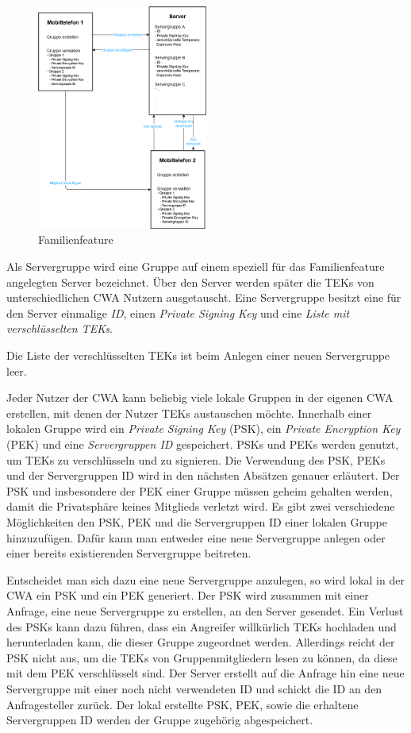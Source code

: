 \documentclass[conference,compsoc]{IEEEtran}
\begin{document}
\begin{figure}[h]
	\centering
	\includegraphics[width=0.5\textwidth]{"Familiengruppe"}
	\caption{Familienfeature}
	\label{Familienfeature_Abbildung}
\end{figure}

Als Servergruppe wird eine Gruppe auf einem speziell für das Familienfeature angelegten Server bezeichnet.
Über den Server werden später die TEKs von unterschiedlichen CWA Nutzern ausgetauscht.
Eine Servergruppe besitzt eine für den Server einmalige \textit{ID}, einen \textit{Private Signing Key } und eine \textit{Liste mit verschlüsselten TEKs}.

Die Liste der verschlüsselten TEKs ist beim Anlegen einer neuen Servergruppe leer.

Jeder Nutzer der CWA kann beliebig viele lokale Gruppen in der eigenen CWA erstellen, mit denen der Nutzer TEKs austauschen möchte.
Innerhalb einer lokalen Gruppe wird ein \textit{Private Signing Key} (PSK), ein \textit{Private Encryption Key} (PEK) und eine \textit{Servergruppen ID} gespeichert.
PSKs und PEKs werden genutzt, um TEKs zu verschlüsseln und zu signieren.
Die Verwendung des PSK, PEKs und der Servergruppen ID wird in den nächsten Absätzen genauer erläutert.
Der PSK und insbesondere der PEK einer Gruppe müssen geheim gehalten werden, damit die Privatsphäre keines Mitglieds verletzt wird.
Es gibt zwei verschiedene Möglichkeiten den PSK, PEK und die Servergruppen ID einer lokalen Gruppe hinzuzufügen.
Dafür kann man entweder eine neue Servergruppe anlegen oder einer bereits existierenden Servergruppe beitreten.

Entscheidet man sich dazu eine neue Servergruppe anzulegen, so wird lokal in der CWA ein PSK und ein PEK generiert.
Der PSK wird zusammen mit einer Anfrage, eine neue Servergruppe zu erstellen, an den Server gesendet.
Ein Verlust des PSKs kann dazu führen, dass ein Angreifer willkürlich TEKs hochladen und herunterladen kann, die dieser Gruppe zugeordnet werden.
Allerdings reicht der PSK nicht aus, um die TEKs von Gruppenmitgliedern lesen zu können, da diese mit dem PEK verschlüsselt sind.
Der Server erstellt auf die Anfrage hin eine neue Servergruppe mit einer noch nicht verwendeten ID und schickt die ID an den Anfragesteller zurück.
Der lokal erstellte PSK, PEK, sowie die erhaltene Servergruppen ID werden der Gruppe zugehörig abgespeichert.
\end{document}
